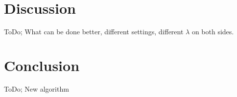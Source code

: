\documentclass[twoside]{article}
\begin{document}
\begin{multicols}{2}
\section{Discussion}
ToDo; What can be done better, different settings, different $\lambda$ on both sides.

\section{Conclusion}
ToDo; New algorithm




\end{multicols}
\end{document}
